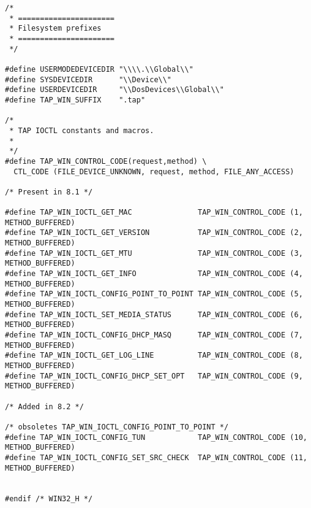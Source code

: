 \begin{center}
\begin{lstlisting}[caption=Code von win32.h]
/*
 * ======================
 * Filesystem prefixes
 * ======================
 */

#define USERMODEDEVICEDIR "\\\\.\\Global\\"
#define SYSDEVICEDIR      "\\Device\\"
#define USERDEVICEDIR     "\\DosDevices\\Global\\"
#define TAP_WIN_SUFFIX    ".tap"

/*
 * TAP IOCTL constants and macros.
 *
 */
#define TAP_WIN_CONTROL_CODE(request,method) \
  CTL_CODE (FILE_DEVICE_UNKNOWN, request, method, FILE_ANY_ACCESS)

/* Present in 8.1 */

#define TAP_WIN_IOCTL_GET_MAC               TAP_WIN_CONTROL_CODE (1, METHOD_BUFFERED)
#define TAP_WIN_IOCTL_GET_VERSION           TAP_WIN_CONTROL_CODE (2, METHOD_BUFFERED)
#define TAP_WIN_IOCTL_GET_MTU               TAP_WIN_CONTROL_CODE (3, METHOD_BUFFERED)
#define TAP_WIN_IOCTL_GET_INFO              TAP_WIN_CONTROL_CODE (4, METHOD_BUFFERED)
#define TAP_WIN_IOCTL_CONFIG_POINT_TO_POINT TAP_WIN_CONTROL_CODE (5, METHOD_BUFFERED)
#define TAP_WIN_IOCTL_SET_MEDIA_STATUS      TAP_WIN_CONTROL_CODE (6, METHOD_BUFFERED)
#define TAP_WIN_IOCTL_CONFIG_DHCP_MASQ      TAP_WIN_CONTROL_CODE (7, METHOD_BUFFERED)
#define TAP_WIN_IOCTL_GET_LOG_LINE          TAP_WIN_CONTROL_CODE (8, METHOD_BUFFERED)
#define TAP_WIN_IOCTL_CONFIG_DHCP_SET_OPT   TAP_WIN_CONTROL_CODE (9, METHOD_BUFFERED)

/* Added in 8.2 */

/* obsoletes TAP_WIN_IOCTL_CONFIG_POINT_TO_POINT */
#define TAP_WIN_IOCTL_CONFIG_TUN            TAP_WIN_CONTROL_CODE (10, METHOD_BUFFERED)
#define TAP_WIN_IOCTL_CONFIG_SET_SRC_CHECK  TAP_WIN_CONTROL_CODE (11, METHOD_BUFFERED)


#endif /* WIN32_H */
\end{lstlisting}
\end{center}

